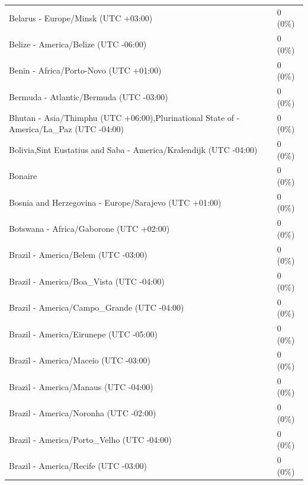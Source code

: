 \begin{appendix}
\begin{table}
{\begin{tabular}[t]{ll}
\hspace{1em}Belarus - Europe/Minsk (UTC +03:00) & 0 (0\%)\\
\hspace{1em}Belize - America/Belize (UTC -06:00) & 0 (0\%)\\
\addlinespace
\hspace{1em}Benin - Africa/Porto-Novo (UTC +01:00) & 0 (0\%)\\
\hspace{1em}Bermuda - Atlantic/Bermuda (UTC -03:00) & 0 (0\%)\\
\hspace{1em}Bhutan - Asia/Thimphu (UTC +06:00),Plurinational State of - America/La\_Paz (UTC -04:00) & 0 (0\%)\\
\hspace{1em}Bolivia,Sint Eustatius and Saba - America/Kralendijk (UTC -04:00) & 0 (0\%)\\
\hspace{1em}Bonaire & 0 (0\%)\\
\addlinespace
\hspace{1em}Bosnia and Herzegovina - Europe/Sarajevo (UTC +01:00) & 0 (0\%)\\
\hspace{1em}Botswana - Africa/Gaborone (UTC +02:00) & 0 (0\%)\\
\hspace{1em}Brazil - America/Belem (UTC -03:00) & 0 (0\%)\\
\hspace{1em}Brazil - America/Boa\_Vista (UTC -04:00) & 0 (0\%)\\
\hspace{1em}Brazil - America/Campo\_Grande (UTC -04:00) & 0 (0\%)\\
\addlinespace
\hspace{1em}Brazil - America/Eirunepe (UTC -05:00) & 0 (0\%)\\
\hspace{1em}Brazil - America/Maceio (UTC -03:00) & 0 (0\%)\\
\hspace{1em}Brazil - America/Manaus (UTC -04:00) & 0 (0\%)\\
\hspace{1em}Brazil - America/Noronha (UTC -02:00) & 0 (0\%)\\
\hspace{1em}Brazil - America/Porto\_Velho (UTC -04:00) & 0 (0\%)\\
\addlinespace
\hspace{1em}Brazil - America/Recife (UTC -03:00) & 0 (0\%)\\

\end{tabular}}
\end{table}
\end{appendix}
